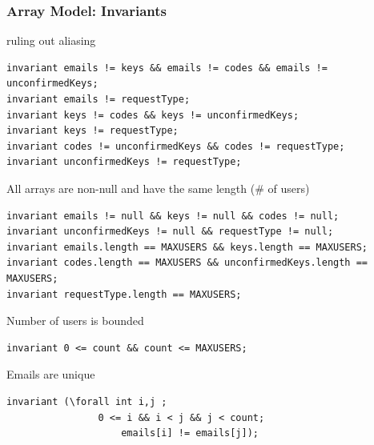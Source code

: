 \documentclass{beamer}
\begin{document}
\begin{frame}[fragile]
    \frametitle{Array Model: Invariants}
    
  \begin{block}{\small ruling out aliasing}
    \begin{lstlisting}
invariant emails != keys && emails != codes && emails != unconfirmedKeys;
invariant emails != requestType;
invariant keys != codes && keys != unconfirmedKeys;
invariant keys != requestType;
invariant codes != unconfirmedKeys && codes != requestType;
invariant unconfirmedKeys != requestType;\end{lstlisting}
  \end{block}
  \vspace{-1em}
  \begin{block}{\small All arrays are non-null and have the same length (\# of users)}
\begin{lstlisting}
invariant emails != null && keys != null && codes != null;
invariant unconfirmedKeys != null && requestType != null;
invariant emails.length == MAXUSERS && keys.length == MAXUSERS;
invariant codes.length == MAXUSERS && unconfirmedKeys.length == MAXUSERS;
invariant requestType.length == MAXUSERS;\end{lstlisting}
  \end{block}
  \vspace{-1em}
  \begin{block}{\small Number of users is bounded}
\begin{lstlisting}
invariant 0 <= count && count <= MAXUSERS;\end{lstlisting}
  \end{block}
  \vspace{-1em}
\begin{block}{\small Emails are unique}
\begin{lstlisting}  
invariant (\forall int i,j ; 
                0 <= i && i < j && j < count; 
                    emails[i] != emails[j]);\end{lstlisting}
  \end{block}
\end{frame}



\end{document}

